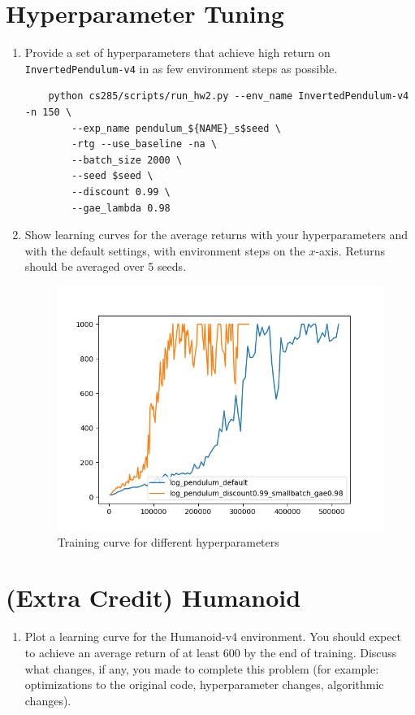 \documentclass{article}
\begin{document}
\newpage\section{Hyperparameter Tuning}
\begin{enumerate}
        \item Provide a set of hyperparameters that achieve high return on \verb|InvertedPendulum-v4| in as few environment steps as possible.
        

\MYSOLUTION
\begin{verbatim}
    python cs285/scripts/run_hw2.py --env_name InvertedPendulum-v4 -n 150 \
        --exp_name pendulum_${NAME}_s$seed \
        -rtg --use_baseline -na \
        --batch_size 2000 \
        --seed $seed \
        --discount 0.99 \
        --gae_lambda 0.98
\end{verbatim}
        \item Show learning curves for the average returns with your hyperparameters and with the default settings, with environment steps on the $x$-axis. Returns should be averaged over 5 seeds.
        
\MYSOLUTION

\begin{figure}[H]
        \centering
        \includegraphics[width=0.5\linewidth]{./report/assets/E4_all.png} %
        \caption{Training curve for different hyperparameters}
        \label{fig:E3}      
\end{figure}
\end{enumerate}

\newpage\section{(Extra Credit) Humanoid}
\begin{enumerate}
        \item Plot a learning curve for the Humanoid-v4 environment. You should expect to achieve an average return of at least 600 by the end of training. Discuss what changes, if any, you made to complete this problem (for example: optimizations to the original code, hyperparameter changes, algorithmic changes).
\end{enumerate}
\end{document}

